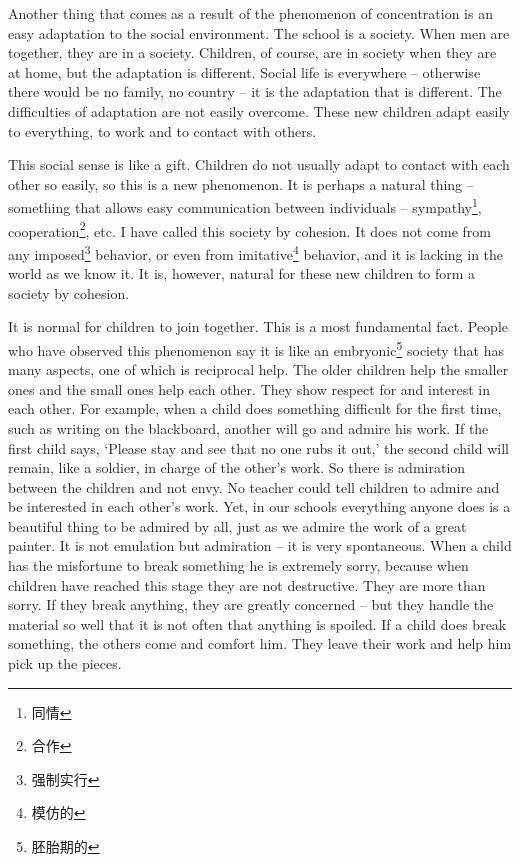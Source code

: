 \documentclass[lang=cn,10pt]{elegantbook}
\begin{document}
Another thing that comes as a result of the phenomenon of concentration is an easy adaptation to the social environment. The school is a society. When men are together, they are in a society. Children, of course, are in society when they are at home, but the adaptation is different. Social life is everywhere – otherwise there would be no family, no country – it is the adaptation that is different. The difficulties of adaptation are not easily overcome. These new children adapt easily to everything, to work and to contact with others.

This social sense is like a gift. Children do not usually adapt to contact with each other so easily, so this is a new phenomenon. It is perhaps a natural thing – something that allows easy communication between individuals – sympathy\footnote{同情}, cooperation\footnote{合作}, etc. I have called this society by cohesion. It does not come from any imposed\footnote{强制实行} behavior, or even from imitative\footnote{模仿的} behavior, and it is lacking in the world as we know it. It is, however, natural for these new children to form a society by cohesion.

It is normal for children to join together. This is a most fundamental fact. People who have observed this phenomenon say it is like an embryonic\footnote{胚胎期的} society that has many aspects, one of which is reciprocal help. The older children help the smaller ones and the small ones help each other. They show respect for and interest in each other. For example, when a child does something difficult for the first time, such as writing on the blackboard, another will go and admire his work. If the first child says, ‘Please stay and see that no one rubs it out,’ the second child will remain, like a soldier, in charge of the other’s work. So there is admiration between the children and not envy. No teacher could tell children to admire and be interested in each other's work. Yet, in our schools everything anyone does is a beautiful thing to be admired by all, just as we admire the work of a great painter. It is not emulation but admiration – it is very spontaneous. When a child has the misfortune to break something he is extremely sorry, because when children have reached this stage they are not destructive. They are more than sorry. If they break anything, they are greatly concerned – but they handle the material so well that it is not often that anything is spoiled. If a child does break something, the others come and comfort him. They leave their work and help him pick up the pieces.
\end{document}
